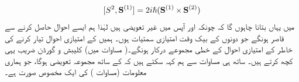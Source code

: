 \begin{align}\label{مساوات_تین_ابعادی_مربع_ایک_مقلوب}
[S^2 , \operatorname{\mathbf{S}}^{(1)}] = 2 i \hslash (\operatorname{\mathbf{S}}^{(1)} \times \operatorname{\mathbf{S}}^{(2)})
\end{align}
 میں یہاں بتانا چاہوں گا کہ چونکہ  اور  آپس میں غیر تعویضی  ہیں لہٰذا ہم ایسے احوال حاصل کرنے سے قاصر ہونگے جو دونوں کے بیک وقت امتیازی سمتیات ہوں۔ ہمیں  کے امتیازی احوال تیار کرنے کی خاطر  کے امتیازی احوال کے خطی مجموعے درکار ہونگے۔( مساوات  میں) کلیبش و گورڈن  ضریب  یہی کچھ کرتے ہیں۔ ساتھ ہی مساوات  سے ہم کہہ سکتے ہیں کہ  کے ساتھ
 مجموعہ   تعویضی ہوگا، جو ہماری معلومات (مساوات ) کی ایک مخصوص صورت ہے۔


